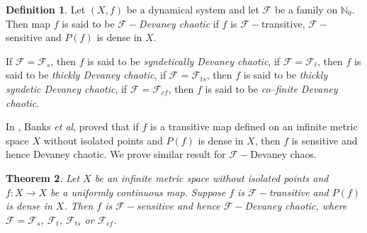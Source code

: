 \documentclass{amsart}[12pt, papera4]
\newtheorem{theorem}{Theorem}[section]
\theoremstyle{definition}
\newtheorem{definition}[theorem]{Definition}
\theoremstyle{remark}
\numberwithin{equation}{section}
\def\N{{\mathbb N}}
\def\F{{\mathscr{F}}}
\def\FS{{\mathscr F_s}}
\begin{document}
\begin{definition}
	Let $(X, f)$ be a dynamical system and let $\F$ be a family on $\N_0$. Then map $f$ is said to be \emph{$\F-$Devaney chaotic} if $f$ is $\F-$transitive, $\F-$sensitive and $P(f)$ is dense in $X$.
\end{definition}

\smallskip
\noindent If $\F=\FS$, then $f$ is said to be \emph{syndetically Devaney chaotic}, if $\F=\F_t$, then $f$ is said to be \emph{thickly Devaney chaotic}, if $\F=\F_{ts}$, then $f$ is said to be \emph{thickly syndetic Devaney chaotic}, if $\F=\F_{cf}$, then $f$ is said to be \emph{co--finite Devaney chaotic}.


\medskip
\noindent  In \cite{Bank}, Banks \textit{et al}, proved that if $f$ is a transitive map defined on an infinite metric space $X$ without isolated points and $P(f)$ is dense in $X$, then $f$ is sensitive and hence Devaney chaotic. We prove similar result for $\F-$Devaney chaos.

\begin{theorem} \label{T35}
	Let  $X$ be an infinite metric space without isolated points and $f: X \longrightarrow X$ be a uniformly continuous map. Suppose $f$ is $\F-$transitive and $P(f)$ is dense in $X$.  Then $f$ is $\F-$sensitive and hence $\F-$Devaney chaotic, where $\F=\F_{s}$, $\F_t$, $\F_{ts}$ or $\F_{cf}$. 
\end{theorem}	
\end{document}
